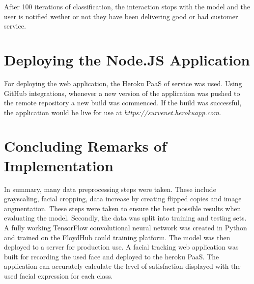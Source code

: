 After 100 iterations of classification, the interaction stops with the model and the user is notified wether or not they have been delivering good or bad customer service.



\section{Deploying the Node.JS Application}


For deploying the web application, the Heroku PaaS of service was used. Using GitHub integrations, whenever a new version of the application was pushed to the remote repository a new build was commenced. If the build was successful, the application would be live for use at \textit{https://survenet.herokuapp.com}.

\section{Concluding Remarks of Implementation}

In summary, many data preprocessing steps were taken. These include grayscaling, facial cropping, data increase by creating flipped copies and image augmentation. These steps were taken to ensure the best possible results when evaluating the model. Secondly, the data was split into training and testing sets. A fully working TensorFlow convolutional neural network was created in Python and trained on the FloydHub could training platform. The model was then deployed to a server for production use. A facial tracking web application was built for recording the used face and deployed to the heroku PaaS. The application can accurately calculate the level of satisfaction displayed with the used facial expression for each class.



